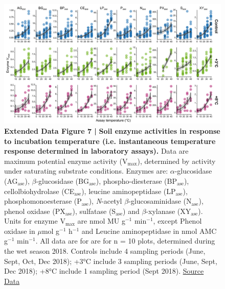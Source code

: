 \documentclass[
  letterpaper,
  DIV=11,
  numbers=noendperiod]{scrartcl}
\begin{document}
\begin{figure}

{\centering \includegraphics[width=1\textwidth,height=\textheight]{FIGURES/Extended_Data_Fig_7.png}

}

\caption{\textbf{Extended Data Figure 7 |}
\textbf{Soil enzyme activities in response to incubation temperature (i.e. instantaneous temperature response determined in laboratory assays).}
Data are maximum potential enzyme activity (V\(_{\mathrm{max}}\)),
determined by activity under saturating substrate conditions. Enzymes
are: \(\alpha\)-glucosidase (AG\(_{\mathrm{ase}}\)),
\(\beta\)-glucosidase (BG\(_{\mathrm{ase}}\)), phospho-diesterase
(BP\(_{\mathrm{ase}}\)), cellolbiohydrolase (CE\(_{\mathrm{ase}}\)),
leucine aminopeptidase (LP\(_{\mathrm{ase}}\)), phosphomonoesterase
(P\(_{\mathrm{ase}}\)), \textsl{N}-acetyl \(\beta\)-glucosaminidase
(N\(_{\mathrm{ase}}\)), phenol oxidase (PX\(_{\mathrm{ase}}\)),
sulfatase (S\(_{\mathrm{ase}}\)) and \(\beta\)-xylanase
(XY\(_{\mathrm{ase}}\)). Units for enzyme V\(_{\mathrm{max}}\) are nmol
MU g\(^{-1}\) min\(^{-1}\), except Phenol oxidase in \(\mu\)mol
g\(^{-1}\) h\(^{-1}\) and Leucine aminopeptidase in nmol AMC g\(^{-1}\)
min\(^{-1}\). All data are for are for n = 10 plots, determined during
the wet season 2018. Controls include 4 sampling periods (June, Sept,
Oct, Dec 2018); +3°C include 3 sampling periods (June, Sept, Dec 2018);
+8°C include 1 sampling period (Sept 2018).
\href{https://doi.org/10.25573/data.20263857}{Source Data}}

\end{figure}
\end{document}
